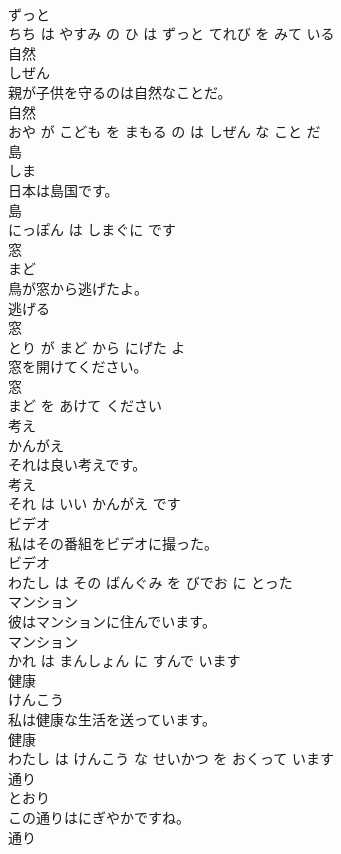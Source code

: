 \documentclass[8pt]{extreport}
\begin{document}
\begin{CJK}{UTF8}{min}
\\	ずっと 
\\	ちち は やすみ の ひ は ずっと てれび を みて いる			
\\	自然	
\\	しぜん			
\\	親が子供を守るのは自然なことだ。	
\\	自然 
\\	おや が こども を まもる の は しぜん な こと だ			
\\	島	
\\	しま			
\\	日本は島国です。	
\\	島 
\\	にっぽん は しまぐに です			
\\	窓	
\\	まど			
\\	鳥が窓から逃げたよ。	
\\	逃げる 
\\	窓 
\\	とり が まど から にげた よ			
\\	窓を開けてください。	
\\	窓 
\\	まど を あけて ください			
\\	考え	
\\	かんがえ			
\\	それは良い考えです。	
\\	考え 
\\	それ は いい かんがえ です			
\\	ビデオ	
\\	私はその番組をビデオに撮った。	
\\	ビデオ 
\\	わたし は その ばんぐみ を びでお に とった			
\\	マンション	
\\	彼はマンションに住んでいます。	
\\	マンション 
\\	かれ は まんしょん に すんで います			
\\	健康	
\\	けんこう			
\\	私は健康な生活を送っています。	
\\	健康 
\\	わたし は けんこう な せいかつ を おくって います			
\\	通り	
\\	とおり			
\\	この通りはにぎやかですね。	
\\	通り 

\end{CJK}
\end{document}
